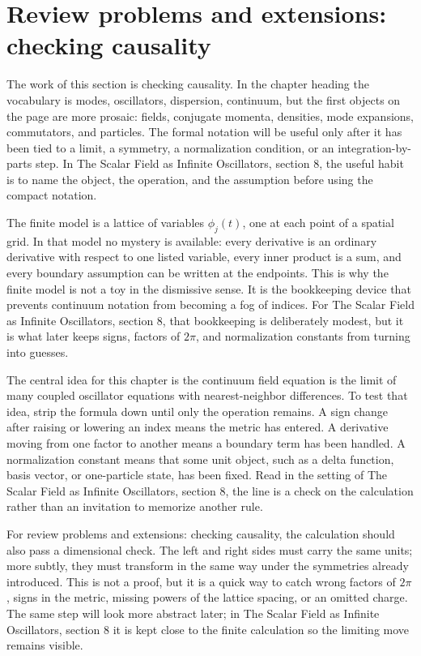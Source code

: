 \section{Review problems and extensions: checking causality}

The work of this section is checking causality.  In the chapter heading the vocabulary is modes, oscillators, dispersion, continuum, but the first objects on the page are more prosaic: fields, conjugate momenta, densities, mode expansions, commutators, and particles.  The formal notation will be useful only after it has been tied to a limit, a symmetry, a normalization condition, or an integration-by-parts step.  In The Scalar Field as Infinite Oscillators, section 8, the useful habit is to name the object, the operation, and the assumption before using the compact notation.

The finite model is a lattice of variables \(\phi_j(t)\), one at each point of a spatial grid.  In that model no mystery is available: every derivative is an ordinary derivative with respect to one listed variable, every inner product is a sum, and every boundary assumption can be written at the endpoints.  This is why the finite model is not a toy in the dismissive sense.  It is the bookkeeping device that prevents continuum notation from becoming a fog of indices.  For The Scalar Field as Infinite Oscillators, section 8, that bookkeeping is deliberately modest, but it is what later keeps signs, factors of \(2\pi\), and normalization constants from turning into guesses.

The central idea for this chapter is the continuum field equation is the limit of many coupled oscillator equations with nearest-neighbor differences.  To test that idea, strip the formula down until only the operation remains.  A sign change after raising or lowering an index means the metric has entered.  A derivative moving from one factor to another means a boundary term has been handled.  A normalization constant means that some unit object, such as a delta function, basis vector, or one-particle state, has been fixed.  Read in the setting of The Scalar Field as Infinite Oscillators, section 8, the line is a check on the calculation rather than an invitation to memorize another rule.

For review problems and extensions: checking causality, the calculation should also pass a dimensional check.  The left and right sides must carry the same units; more subtly, they must transform in the same way under the symmetries already introduced.  This is not a proof, but it is a quick way to catch wrong factors of \(2\pi\), signs in the metric, missing powers of the lattice spacing, or an omitted charge.  The same step will look more abstract later; in The Scalar Field as Infinite Oscillators, section 8 it is kept close to the finite calculation so the limiting move remains visible.


